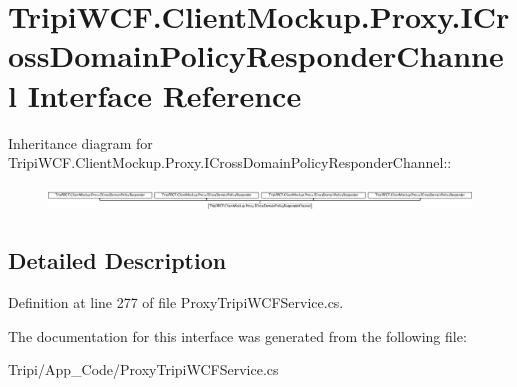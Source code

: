 \hypertarget{interface_tripi_w_c_f_1_1_client_mockup_1_1_proxy_1_1_i_cross_domain_policy_responder_channel}{
\section{TripiWCF.ClientMockup.Proxy.ICrossDomainPolicyResponderChannel Interface Reference}
\label{interface_tripi_w_c_f_1_1_client_mockup_1_1_proxy_1_1_i_cross_domain_policy_responder_channel}
}
Inheritance diagram for TripiWCF.ClientMockup.Proxy.ICrossDomainPolicyResponderChannel::\begin{figure}[H]
\begin{center}
\leavevmode
\includegraphics[height=0.673077cm]{interface_tripi_w_c_f_1_1_client_mockup_1_1_proxy_1_1_i_cross_domain_policy_responder_channel}
\end{center}
\end{figure}


\subsection{Detailed Description}


Definition at line 277 of file ProxyTripiWCFService.cs.

The documentation for this interface was generated from the following file:\begin{DoxyCompactItemize}
\item 
Tripi/App\_\-Code/ProxyTripiWCFService.cs\end{DoxyCompactItemize}
